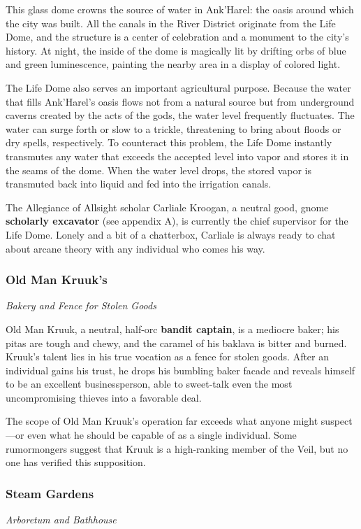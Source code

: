 \documentclass[10pt,a4paper,twoside,bg=print,twocolumn,openany,nodeprecatedcode]{dndbook}
\begin{document}
This glass dome crowns the source of water in Ank'Harel: the oasis around which the city was built. All the canals in the River District originate from the Life Dome, and the structure is a center of celebration and a monument to the city's history. At night, the inside of the dome is magically lit by drifting orbs of blue and green luminescence, painting the nearby area in a display of colored light.

The Life Dome also serves an important agricultural purpose. Because the water that fills Ank'Harel's oasis flows not from a natural source but from underground caverns created by the acts of the gods, the water level frequently fluctuates. The water can surge forth or slow to a trickle, threatening to bring about floods or dry spells, respectively. To counteract this problem, the Life Dome instantly transmutes any water that exceeds the accepted level into vapor and stores it in the seams of the dome. When the water level drops, the stored vapor is transmuted back into liquid and fed into the irrigation canals.

The Allegiance of Allsight scholar Carliale Kroogan, a neutral good, gnome \textbf{scholarly excavator} (see appendix A), is currently the chief supervisor for the Life Dome. Lonely and a bit of a chatterbox, Carliale is always ready to chat about arcane theory with any individual who comes his way.

\subsubsection{Old Man Kruuk's}
\textit{Bakery and Fence for Stolen Goods}

Old Man Kruuk, a neutral, half-orc \textbf{bandit captain}, is a mediocre baker; his pitas are tough and chewy, and the caramel of his baklava is bitter and burned. Kruuk's talent lies in his true vocation as a fence for stolen goods. After an individual gains his trust, he drops his bumbling baker facade and reveals himself to be an excellent businessperson, able to sweet-talk even the most uncompromising thieves into a favorable deal.

The scope of Old Man Kruuk's operation far exceeds what anyone might suspect—or even what he should be capable of as a single individual. Some rumormongers suggest that Kruuk is a high-ranking member of the Veil, but no one has verified this supposition.

\subsubsection{Steam Gardens}
\textit{Arboretum and Bathhouse}
\end{document}

